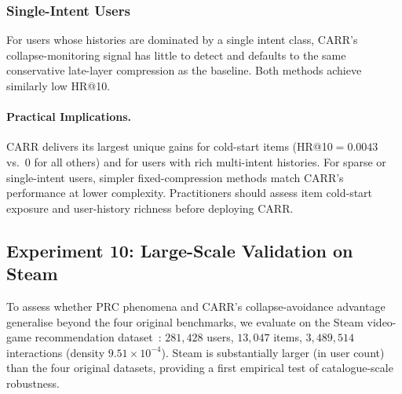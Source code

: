 \documentclass[lettersize,journal]{IEEEtran}
\begin{document}
\subsubsection{Single-Intent Users}
For users whose histories are dominated by a single intent class, CARR's collapse-monitoring signal has little to detect and defaults to the same conservative late-layer compression as the baseline. Both methods achieve similarly low HR@10.

\paragraph{Practical Implications.}
CARR delivers its largest unique gains for cold-start items (HR@10$=0.0043$ vs.\ 0 for all others) and for users with rich multi-intent histories. For sparse or single-intent users, simpler fixed-compression methods match CARR's performance at lower complexity. Practitioners should assess item cold-start exposure and user-history richness before deploying CARR.

\subsection{Experiment 10: Large-Scale Validation on Steam}

To assess whether PRC phenomena and CARR's collapse-avoidance advantage generalise beyond the four original benchmarks, we evaluate on the Steam video-game recommendation dataset~\cite{steam2019}: $281{,}428$ users, $13{,}047$ items, $3{,}489{,}514$ interactions (density $9.51 \times 10^{-4}$). Steam is substantially larger (in user count) than the four original datasets, providing a first empirical test of catalogue-scale robustness.
\end{document}
